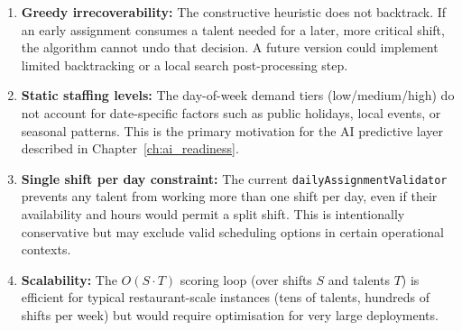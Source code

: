 \begin{enumerate}
    \item \textbf{Greedy irrecoverability:} The constructive heuristic does not backtrack. If an early assignment consumes a talent needed for a later, more critical shift, the algorithm cannot undo that decision. A future version could implement limited backtracking or a local search post-processing step.
    \item \textbf{Static staffing levels:} The day-of-week demand tiers (low/medium/high) do not account for date-specific factors such as public holidays, local events, or seasonal patterns. This is the primary motivation for the AI predictive layer described in Chapter~\ref{ch:ai_readiness}.
    \item \textbf{Single shift per day constraint:} The current \texttt{dailyAssignmentValidator} prevents any talent from working more than one shift per day, even if their availability and hours would permit a split shift. This is intentionally conservative but may exclude valid scheduling options in certain operational contexts.
    \item \textbf{Scalability:} The $O(S \cdot T)$ scoring loop (over shifts $S$ and talents $T$) is efficient for typical restaurant-scale instances (tens of talents, hundreds of shifts per week) but would require optimisation for very large deployments.
\end{enumerate}


